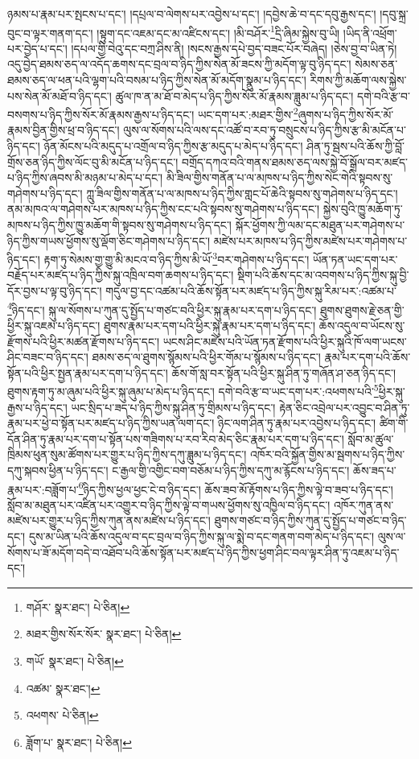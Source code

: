 ཉམས་པ་རྣམ་པར་སྤངས་པ་དང་། །དཔྲལ་བ་ལེགས་པར་འབྱེས་པ་དང་། །དབྱེས་ཆེ་བ་དང་དབུ་རྒྱས་དང་། །དབུ་སྐྲ་བུང་བ་ལྟར་གནག་དང་། །སྟུག་དང་འཇམ་དང་མ་འཛིངས་དང་། །མི་བཤོར་\footnote{གཤོར་  སྣར་ཐང་།  པེ་ཅིན། }དྲི་ཞིམ་སྐྱེས་བུ་ཡི། །ཡིད་ནི་འཕྲོག་པར་བྱེད་པ་དང་། །དཔལ་གྱི་བེའུ་དང་བཀྲ་ཤིས་ནི། །སངས་རྒྱས་དཔེ་བྱད་བཟང་པོར་བཞེད། །ཅེས་བྱ་བ་ཡིན་ཏེ། འདུ་བྱེད་ཐམས་ཅད་ལ་འདོད་ཆགས་དང་བྲལ་བ་ཉིད་ཀྱིས་སེན་མོ་ཟངས་ཀྱི་མདོག་ལྟ་བུ་ཉིད་དང་། སེམས་ཅན་ཐམས་ཅད་ལ་ཕན་པའི་ལྷག་པའི་བསམ་པ་ཉིད་ཀྱིས་སེན་མོ་མདོག་སྣུམ་པ་ཉིད་དང་། རིགས་ཀྱི་མཆོག་ལས་སྐྱེས་པས་སེན་མོ་མཐོ་བ་ཉིད་དང་། ཚུལ་ཁ་ན་མ་ཐོ་བ་མེད་པ་ཉིད་ཀྱིས་སོར་མོ་རྣམས་ཟླུམ་པ་ཉིད་དང་། དགེ་བའི་རྩ་བ་བསགས་པ་ཉིད་ཀྱིས་སོར་མོ་རྣམས་རྒྱས་པ་ཉིད་དང་། ཡང་དག་པར་:མཐར་གྱིས་\footnote{མཐར་གྱིས་སོར་སོར་  སྣར་ཐང་།  པེ་ཅིན། }ཞུགས་པ་ཉིད་ཀྱིས་སོར་མོ་རྣམས་བྱིན་གྱིས་ཕྲ་བ་ཉིད་དང་། ལུས་ལ་སོགས་པའི་ལས་དང་འཚོ་བ་རབ་ཏུ་བསྲུངས་པ་ཉིད་ཀྱིས་རྩ་མི་མངོན་པ་ཉིད་དང་། ཉོན་མོངས་པའི་མདུད་པ་འགྲོལ་བ་ཉིད་ཀྱིས་རྩ་མདུད་པ་མེད་པ་ཉིད་དང་། ཤིན་ཏུ་སྦས་པའི་ཆོས་ཀྱི་བློ་གྲོས་ཅན་ཉིད་ཀྱིས་ལོང་བུ་མི་མངོན་པ་ཉིད་དང་། བགྲོད་དཀའ་བའི་གནས་ཐམས་ཅད་ལས་སྐྱེ་བོ་སྒྲོལ་བར་མཛད་པ་ཉིད་ཀྱིས་ཞབས་མི་མཉམ་པ་མེད་པ་དང་། མི་ཟིལ་གྱིས་གནོན་པ་ལ་མཁས་པ་ཉིད་ཀྱིས་སེང་གེའི་སྟབས་སུ་གཤེགས་པ་ཉིད་དང་། ཀླུ་ཟིལ་གྱིས་གནོན་པ་ལ་མཁས་པ་ཉིད་ཀྱིས་གླང་པོ་ཆེའི་སྟབས་སུ་གཤེགས་པ་ཉིད་དང་། ནམ་མཁའ་ལ་གཤེགས་པར་མཁས་པ་ཉིད་ཀྱིས་ངང་པའི་སྟབས་སུ་གཤེགས་པ་ཉིད་དང་། སྐྱེས་བུའི་ཁྱུ་མཆོག་ཏུ་མཁས་པ་ཉིད་ཀྱིས་ཁྱུ་མཆོག་གི་སྟབས་སུ་གཤེགས་པ་ཉིད་དང་། སྐོར་ཕྱོགས་ཀྱི་ལམ་དང་མཐུན་པར་གཤེགས་པ་ཉིད་ཀྱིས་གཡས་ཕྱོགས་སུ་ལྡོག་ཅིང་གཤེགས་པ་ཉིད་དང་། མཛེས་པར་མཁས་པ་ཉིད་ཀྱིས་མཛེས་པར་གཤེགས་པ་ཉིད་དང་། རྟག་ཏུ་སེམས་གྱ་གྱུ་མི་མངའ་བ་ཉིད་ཀྱིས་མི་ཡོ་\footnote{གཡོ་  སྣར་ཐང་།  པེ་ཅིན། }བར་གཤེགས་པ་ཉིད་དང་། ཡོན་ཏན་ཡང་དག་པར་བརྗོད་པར་མཛད་པ་ཉིད་ཀྱིས་སྐུ་འཁྲིལ་བག་ཆགས་པ་ཉིད་དང་། སྡིག་པའི་ཆོས་དང་མ་འབགས་པ་ཉིད་ཀྱིས་སྐུ་བྱི་དོར་བྱས་པ་ལྟ་བུ་ཉིད་དང་། གདུལ་བྱ་དང་འཚམ་པའི་ཆོས་སྟོན་པར་མཛད་པ་ཉིད་ཀྱིས་སྐུ་རིམ་པར་:འཚམ་པ་\footnote{འཚམ་  སྣར་ཐང་། }ཉིད་དང་། སྐུ་ལ་སོགས་པ་ཀུན་དུ་སྤྱོད་པ་གཙང་བའི་ཕྱིར་སྐུ་རྣམ་པར་དག་པ་ཉིད་དང་། ཐུགས་ཐུགས་རྗེ་ཅན་གྱི་ཕྱིར་སྐུ་འཇམ་པ་ཉིད་དང་། ཐུགས་རྣམ་པར་དག་པའི་ཕྱིར་སྐུ་རྣམ་པར་དག་པ་ཉིད་དང་། ཆོས་འདུལ་བ་ཡོངས་སུ་རྫོགས་པའི་ཕྱིར་མཚན་རྫོགས་པ་ཉིད་དང་། ཡངས་ཤིང་མཛེས་པའི་ཡོན་ཏན་རྫོགས་པའི་ཕྱིར་སྐུའི་ཁོ་ལག་ཡངས་ཤིང་བཟང་བ་ཉིད་དང་། ཐམས་ཅད་ལ་ཐུགས་སྙོམས་པའི་ཕྱིར་གོམ་པ་སྙོམས་པ་ཉིད་དང་། རྣམ་པར་དག་པའི་ཆོས་སྟོན་པའི་ཕྱིར་སྤྱན་རྣམ་པར་དག་པ་ཉིད་དང་། ཆོས་གོ་སླ་བར་སྟོན་པའི་ཕྱིར་སྐུ་ཤིན་ཏུ་གཞོན་ཤ་ཅན་ཉིད་དང་། ཐུགས་རྟག་ཏུ་མ་ཞུམ་པའི་ཕྱིར་སྐུ་ཞུམ་པ་མེད་པ་ཉིད་དང་། དགེ་བའི་རྩ་བ་ཡང་དག་པར་:འཕགས་པའི་\footnote{འཕགས་  པེ་ཅིན། }ཕྱིར་སྐུ་རྒྱས་པ་ཉིད་དང་། ཡང་སྲིད་པ་ཟད་པ་ཉིད་ཀྱིས་སྐུ་ཤིན་ཏུ་གྲིམས་པ་ཉིད་དང་། རྟེན་ཅིང་འབྲེལ་པར་འབྱུང་བ་ཤིན་ཏུ་རྣམ་པར་ཕྱེ་བ་སྟོན་པར་མཛད་པ་ཉིད་ཀྱིས་ཡན་ལག་དང་། ཉིང་ལག་ཤིན་ཏུ་རྣམ་པར་འབྱེས་པ་ཉིད་དང་། ཚིག་གི་དོན་ཤིན་ཏུ་རྣམ་པར་དག་པ་སྟོན་པས་གཟིགས་པ་རབ་རིབ་མེད་ཅིང་རྣམ་པར་དག་པ་ཉིད་དང་། སློབ་མ་ཚུལ་ཁྲིམས་ཕུན་སུམ་ཚོགས་པར་གྱུར་པ་ཉིད་ཀྱིས་དཀུ་ཟླུམ་པ་ཉིད་དང་། འཁོར་བའི་སྐྱོན་གྱིས་མ་སྦགས་པ་ཉིད་ཀྱིས་དཀུ་སྐབས་ཕྱིན་པ་ཉིད་དང་། ང་རྒྱལ་གྱི་འགྱིང་བག་བཅོམ་པ་ཉིད་ཀྱིས་དཀུ་མ་རྙོངས་པ་ཉིད་དང་། ཆོས་ཟད་པ་རྣམ་པར་:བཟློག་པ་\footnote{ཟློག་པ་  སྣར་ཐང་།  པེ་ཅིན། }ཉིད་ཀྱིས་ཕྱལ་ཕྱང་ངེ་བ་ཉིད་དང་། ཆོས་ཟབ་མོ་རྟོགས་པ་ཉིད་ཀྱིས་ལྟེ་བ་ཟབ་པ་ཉིད་དང་། སློབ་མ་མཐུན་པར་འཛིན་པར་འགྱུར་བ་ཉིད་ཀྱིས་ལྟེ་བ་གཡས་ཕྱོགས་སུ་འཁྱིལ་བ་ཉིད་དང་། འཁོར་ཀུན་ནས་མཛེས་པར་གྱུར་པ་ཉིད་ཀྱིས་ཀུན་ནས་མཛེས་པ་ཉིད་དང་། ཐུགས་གཙང་བ་ཉིད་ཀྱིས་ཀུན་དུ་སྤྱོད་པ་གཙང་བ་ཉིད་དང་། དུས་མ་ཡིན་པའི་ཆོས་འདུལ་བ་དང་བྲལ་བ་ཉིད་ཀྱིས་སྐུ་ལ་སྨེ་བ་དང་གནག་བག་མེད་པ་ཉིད་དང་། ལུས་ལ་སོགས་པ་ཟོ་མདོག་བདེ་བ་འཐོབ་པའི་ཆོས་སྟོན་པར་མཛད་པ་ཉིད་ཀྱིས་ཕྱག་ཤིང་བལ་ལྟར་ཤིན་ཏུ་འཇམ་པ་ཉིད་དང་། 